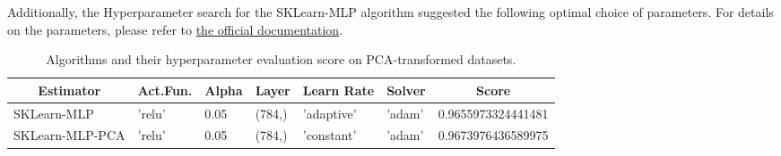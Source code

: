 Additionally, the Hyperparameter search for the SKLearn-MLP algorithm suggested the following optimal choice of parameters.
For details on the parameters, please refer to \href{https://scikit-learn.org/stable/modules/generated/sklearn.neural_network.MLPClassifier.html}{the official documentation}.

\begin{table}[H]
    \centering
    \begin{tabular}{|l|l|l|l|l|l|l|}\hline
        \multicolumn{1}{|c|}{Estimator} & \multicolumn{1}{|c|}{Act.Fun.} & \multicolumn{1}{|c|}{Alpha} & \multicolumn{1}{|c|}{Layer} & \multicolumn{1}{|c|}{Learn Rate} & \multicolumn{1}{|c|}{Solver} & \multicolumn{1}{|c|}{Score} \\\hline
        SKLearn-MLP & 'relu' & 0.05 & (784,) & 'adaptive' & 'adam' & 0.9655973324441481 \\       
        SKLearn-MLP-PCA & 'relu' & 0.05 & (784,) & 'constant' & 'adam' & 0.9673976436589975 \\\hline        
    \end{tabular}
    \caption{Algorithms and their hyperparameter evaluation score on PCA-transformed datasets.}
    \label{tab:nn_results_hyperparameter}
\end{table}




